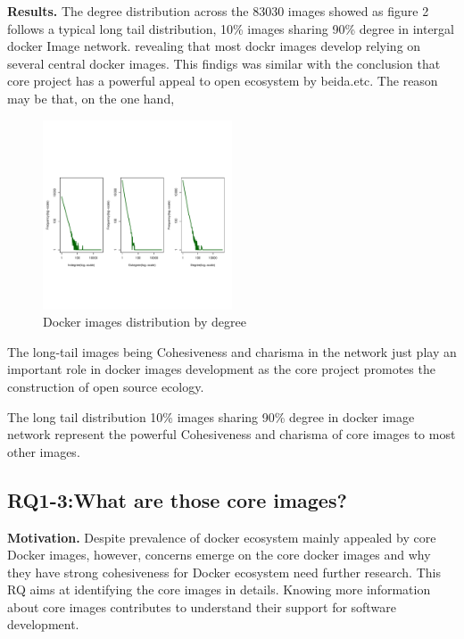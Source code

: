 \documentclass[sigconf]{acmart}
\begin{document}
\noindent\textbf{Results. }The degree distribution across the 83030 images showed as figure 2 follows a typical long tail distribution, 10\% images sharing 90\% degree in intergal docker Image network.         revealing that most dockr images develop relying on several central docker images. This findigs was similar with the conclusion that core project has a powerful appeal to open ecosystem by beida.etc. The reason may be that, on the one hand, 


\begin{figure}[htbp]
\centerline{\includegraphics[width=0.5\textwidth,trim=0 90 0 120,clip]{picture//image_distribution_degree.pdf}}
\caption{Docker images distribution by degree}
\label{fig}
\end{figure}

The long-tail images being Cohesiveness and charisma in the network just play an important role in docker images development as the core project promotes the construction of open source ecology.

\begin{mybox}

The long tail distribution 10\% images sharing 90\% degree in docker image network represent the powerful Cohesiveness and charisma of core images to most other images. 
\end{mybox}


\subsection{RQ1-3:What are those core images?}
\noindent\textbf{Motivation. }Despite prevalence of docker ecosystem mainly appealed by core Docker images, however, concerns emerge on the core docker images and why they have strong cohesiveness for Docker ecosystem need further research. This RQ aims at identifying the core images in details. Knowing more information about core images contributes to understand their support for software development. 
\end{document}
